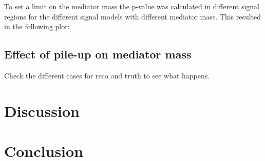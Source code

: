 To set a limit on the mediator mass the p-value was calculated in different signal regions for the different signal models with different mediator mass. This resulted in the following plot:


\subsection{Effect of pile-up on mediator mass}
Check the different cases for reco and truth to see what happens.
\section{Discussion}
\section{Conclusion}